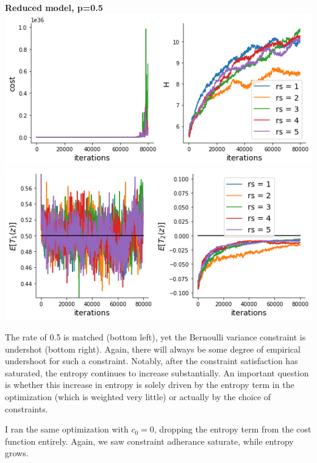 \documentclass[11pt]{article}
\begin{document}
\begin{center}
\textbf{Reduced model, p=0.5} \\
\includegraphics[scale=0.6]{figs/cost_H_SC_reduced_c=15_p=50.png} \\
\includegraphics[scale=0.6]{figs/constraints_SC_reduced_c=15_p=50.png}
\end{center}

The rate of 0.5 is matched (bottom left), yet the Bernoulli variance constraint is undershot (bottom right).  Again, there will always be some degree of empirical undershoot for such a constraint.  Notably, after the constraint satisfaction has saturated, the entropy continues to increase substantially.  An important question is whether this increase in entropy is solely driven by the entropy term in the optimization (which is weighted very little) or actually by the choice of constraints.

I ran the same optimization with $c_0 = 0$, dropping the entropy term from the cost function entirely.  Again, we saw constraint adherance saturate, while entropy grows.
\end{document}
